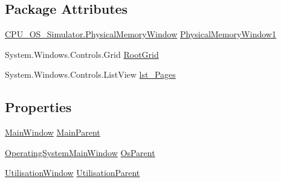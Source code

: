 \subsection*{Package Attributes}
\begin{DoxyCompactItemize}
\item 
\hyperlink{class_c_p_u___o_s___simulator_1_1_physical_memory_window}{C\+P\+U\+\_\+\+O\+S\+\_\+\+Simulator.\+Physical\+Memory\+Window} \hyperlink{class_c_p_u___o_s___simulator_1_1_physical_memory_window_a39cc526d8fdaf4273ec0dd5c6c3d6c80}{Physical\+Memory\+Window1}
\item 
System.\+Windows.\+Controls.\+Grid \hyperlink{class_c_p_u___o_s___simulator_1_1_physical_memory_window_adc6eedac01af3196b12b373ce81191b5}{Root\+Grid}
\item 
System.\+Windows.\+Controls.\+List\+View \hyperlink{class_c_p_u___o_s___simulator_1_1_physical_memory_window_add72f4e30bf2c80b61085ddad3e00cd7}{lst\+\_\+\+Pages}
\end{DoxyCompactItemize}
\subsection*{Properties}
\begin{DoxyCompactItemize}
\item 
\hyperlink{class_c_p_u___o_s___simulator_1_1_main_window}{Main\+Window} \hyperlink{class_c_p_u___o_s___simulator_1_1_physical_memory_window_a92c0bae7be87dec28931111c94155cf5}{Main\+Parent}
\item 
\hyperlink{class_c_p_u___o_s___simulator_1_1_operating_system_main_window}{Operating\+System\+Main\+Window} \hyperlink{class_c_p_u___o_s___simulator_1_1_physical_memory_window_a0a61a168c75bdc6c63c3cff40018bab1}{Os\+Parent}
\item 
\hyperlink{class_c_p_u___o_s___simulator_1_1_utilisation_window}{Utilisation\+Window} \hyperlink{class_c_p_u___o_s___simulator_1_1_physical_memory_window_a94864d8709996e908fbaff4056eba5a4}{Utilisation\+Parent}
\end{DoxyCompactItemize}

